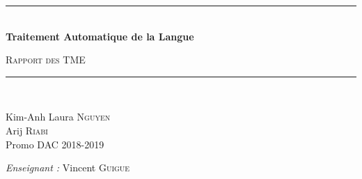 \documentclass[a4paper]{article}
\newcommand{\HRule}{\rule{\linewidth}{0.5mm}}
\begin{document}
\begin{titlepage}
  \begin{center}


    \vspace{4cm}
    \HRule \\[0.4cm]
    { \huge \bfseries Traitement Automatique de la Langue\\[0.4cm] }

      \textsc{\LARGE Rapport des TME}\\[0.4cm]

    \HRule \\[0.4cm]

    \begin{minipage}{0.4\textwidth}
      \begin{flushleft} \large
        Kim-Anh Laura \textsc{Nguyen}\\
        Arij \textsc{Riabi}\\
        Promo DAC 2018-2019 \\
      \end{flushleft}
    \end{minipage}
    \begin{minipage}{0.5\textwidth}
      \begin{flushright} \large
          \emph{Enseignant :} Vincent \textsc{Guigue}\\
      \end{flushright}
    \end{minipage}

      \vspace{2cm}

  \end{center}
\end{titlepage}

\newpage

\tableofcontents

\newpage
\end{document}
